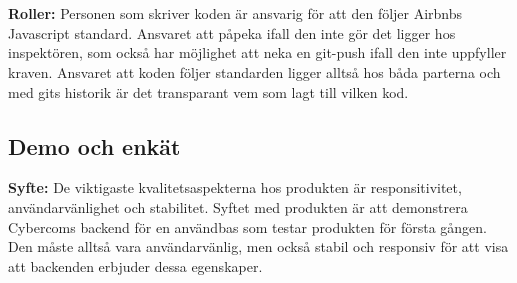 \documentclass[10pt]{article}
\begin{document}
	\\\\
	\textbf{Roller:} Personen som skriver koden är ansvarig för att den följer Airbnbs Javascript standard. Ansvaret att påpeka ifall den inte gör det ligger hos inspektören, som också har möjlighet att neka en git-push ifall den inte uppfyller kraven. Ansvaret att koden följer standarden ligger alltså hos båda parterna och med gits historik är det transparant vem som lagt till vilken kod.
	
	\subsection{Demo och enkät}
	\textbf{Syfte:}	De viktigaste kvalitetsaspekterna hos produkten är responsitivitet, användarvänlighet och stabilitet. Syftet med produkten är att demonstrera Cybercoms backend för en användbas som testar produkten för första gången. Den måste alltså vara användarvänlig, men också stabil och responsiv för att visa att backenden erbjuder dessa egenskaper.
	
\end{document}
